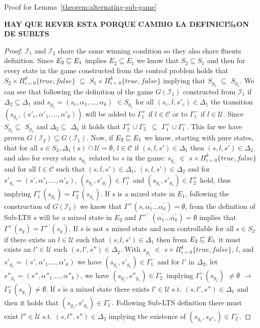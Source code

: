 Proof for Lemma~\ref{theorem:alternating-sub-game}


\textbf{HAY QUE REVER ESTA PORQUE CAMBIO LA DEFINICI‰ON DE SUBLTS}
\begin{proof}
$\mathcal{I}_1$ and $\mathcal{I}_2$ share the same winning condition
so they also share fluents definition.  Since
$E_2 \sqsubseteq E_1$ implies $E_2 \subseteq E_1$ we know that
$S_2 \subseteq S_1$ and then for every state in the game constructed from
the control problem holds that $S_2 \times \Pi_{i=0}^{k}\{true,false\}$
$\subseteq$ $S_1 \times \Pi_{i=0}^{k}\{true,false\}$ implying
that $S_{g_2}$ $\subseteq$ $S_{g_1}$.  
We can see that following the definition of the
game $G(\mathcal{I}_1)$ constructed from $\mathcal{I}_1$ if
$\Delta_2 \subseteq \Delta_1$ and 
$s_{g_1} = (s_e,\alpha_1,\ldots,\alpha_k)$ $\in S_{g_1}$
for all $(s_e, l, s'_e) \in \Delta_1$ the transition
$(s_{g_1},(s'_e,\alpha'_1,\ldots,\alpha'_k))$ will be added
to $\Gamma^{+}_1$ if $l \in \mathcal{C}$ or to $\Gamma^{-}_1$
if $l \in \mathcal{U}$.  Since $S_{g_2} \subseteq$ $S_{g_1}$ and 
$\Delta_2 \subseteq$ $\Delta_1$ it holds that
$\Gamma^{+}_2 \cup \Gamma^{-}_2$ $\subseteq$
$\Gamma^{+}_1 \cup \Gamma^{-}_1$. This far we have proven
$G(\mathcal{I}_2) \subseteq G(\mathcal{I}_1)$.  Now, if 
$E_2 \sqsubseteq E_1$ we know, starting with pure states, that 
for all $s \in S_2, \Delta_1(s)\cap \mathcal{U} = \emptyset$, $l \in \mathcal{C}$ if
$(s,l,s')\in \Delta_1$ then $(s,l,s') \in \Delta_2$ and
also for every state $s_{g_1}$ related to $s$ in the game: $s_{g_1}$ $\in$ $s \times \Pi_{i=0}^{k}\{true,false\}$ and
for all $l \in \mathcal{C}$ such that 
$(s, l, s') \in \Delta_1$, $(s,l,s') \in \Delta_2$ and for
$s'_{g_1}= (s', \alpha'_1. \ldots, \alpha'_k)$, 
$(s_{g_1}, s'_{g_1})$$\in \Gamma^{+}_1$ and $(s_{g_1}, s'_{g_1})$$\in \Gamma^{+}_2$
hold,
thus implying $\Gamma^{+}_1(s_{g_1})$$=$$\Gamma^{+}_2(s_{g_1})$. 
If $s$ is a mixed state in $E_1$, following the construction of 
$G(\mathcal{I}_1)$ we know that
$\Gamma^{+}(s, \alpha_1^{\prime} \ldots \alpha_k^{\prime}) = \emptyset$,
from the definition of Sub-LTS $s$ will be a mixed state in
$E_2$ and $\Gamma^{+ \prime}$
$(\alpha_1^{\prime} \ldots \alpha_k^{\prime}) = \emptyset$ implies that
$\Gamma^{+}(s_g)=\Gamma ^{+ \prime}(s_g)$.
If $s$ is not a mixed
state and non controllable for all $s \in S_2$ if there exists an
$l \in \mathcal{U}$ such that
$(s,l,s')\in \Delta_1$ then from $E_2 \sqsubseteq E_1$ it must exists an 
$l' \in \mathcal{U}$ such $(s,l',s'') \in \Delta_2$.  
With $s_{g_1}$ $\in$ $s \times \Pi_{i=0}^{k}\{true,false\}$, $l$, 
and $s'_{g_1}= (s', \alpha'_1. \ldots, \alpha'_k)$
we have $(s_{g_1}, s'_{g_1})$$\in \Gamma^{-}_1$ and for $l'$ in $\Delta_2$,
let $s''_{g_1}= (s'', \alpha''_1. \ldots, \alpha''_k)$, we have
 $(s_{g_1}, s''_{g_1})$$\in \Gamma^{-}_2$ implying $\Gamma^{-}_1(s_{g_1})$ $ \neq \emptyset$ $\rightarrow$ $\Gamma^{-}_2(s_{g_1}) \neq \emptyset$. 
 If $s$ is a mixed state there exists $l' \in \mathcal{U}$ s.t. 
 $(s,l', s'') \in \Delta_1$ and then it holds that 
 $(s_{g_1}, s'_{g_1}) \in \Gamma_1^{-}$.
 Following Sub-LTS definition there must exist $l'' \in \mathcal{U}$
 s.t. $(s, l'',s'') \in \Delta_2$ implying the existence of 
 $(s_{g_1},s_{g''_1}) \in \Gamma_{2}^{-}$.
\end{proof}
